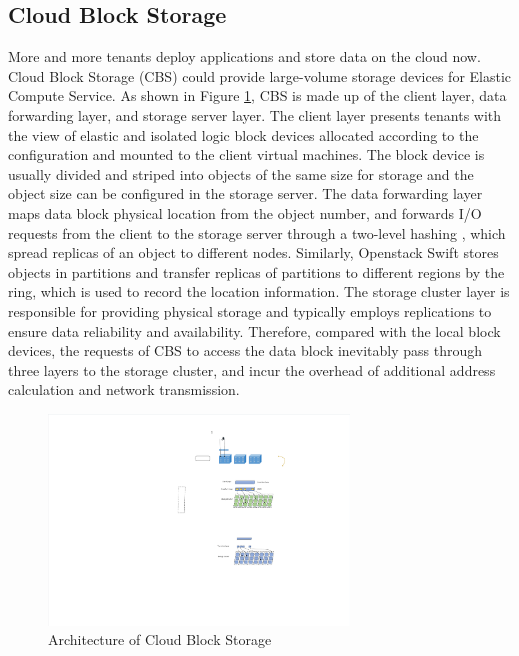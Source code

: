 \documentclass[sigconf, nonacm]{acmart}
\begin{document}
\subsection{Cloud Block Storage}
More and more tenants deploy applications and store data on the cloud now.
Cloud Block Storage (CBS) \cite{zhou2018lea,jin2019reasoning,zhang2020osca} could provide large-volume storage devices for Elastic Compute Service. As shown in Figure \ref{fig:CBS}, CBS is made up of the client layer, data forwarding layer, and storage server layer. 
The client layer presents tenants with the view of elastic and isolated logic block devices allocated according to the configuration and mounted to the client virtual machines. The block device is usually divided and striped into objects of the same size for storage and the object size can be configured in the storage server.
The data forwarding layer maps data block physical location from the object number, and forwards I/O requests from the client to the storage server through a two-level hashing \cite{karger1997consistent,weil2006crush}, which spread replicas of an object to different nodes. Similarly, Openstack Swift \cite{ring} stores objects in partitions and transfer replicas of partitions to different regions by the ring, which is used to record the location information. 
The storage cluster layer is responsible for providing physical storage and typically employs replications to ensure data reliability and availability. Therefore, compared with the local block devices, the requests of CBS to access the data block inevitably pass through three layers to the storage cluster, and incur the overhead of additional address calculation and network transmission.

\begin{figure}[t]
	\centering
	\includegraphics[width=8cm]{figures/ceph_pic/blockdevice.pdf}
	\caption{Architecture of Cloud Block Storage}
	\label{fig:CBS}
\end{figure}
\end{document}

